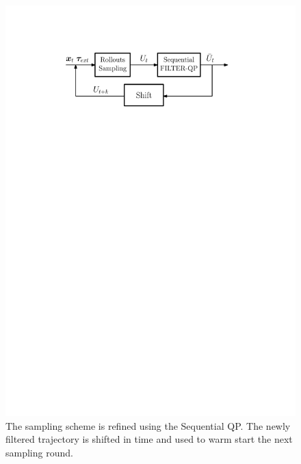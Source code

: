 \begin{figure}[h!]
\centering
\includegraphics[width=0.8\columnwidth]{figures/schemes/stochastic_controller.pdf}
\caption{The sampling scheme is refined using the Sequential QP. The newly filtered trajectory is shifted in time and used to warm start the next sampling round.} \label{fig:sampling_scheme}
\end{figure}
